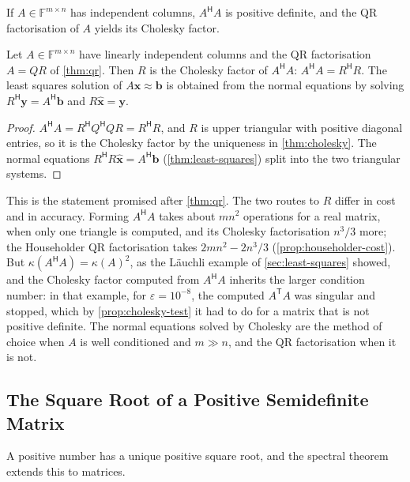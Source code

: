 If $A\in\mathbb F^{m\times n}$ has independent columns, $A^{\mathsf H}A$ is positive definite, and the QR factorisation of $A$ yields its Cholesky factor.

\begin{proposition}
\label{prop:cholesky-qr}
Let $A\in\mathbb F^{m\times n}$ have linearly independent columns and the QR factorisation $A=QR$ of \cref{thm:qr}. Then $R$ is the Cholesky factor of $A^{\mathsf H}A$: $A^{\mathsf H}A=R^{\mathsf H}R$. The least squares solution of $A\mathbf x\approx\mathbf b$ is obtained from the normal equations by solving $R^{\mathsf H}\mathbf y=A^{\mathsf H}\mathbf b$ and $R\hat{\mathbf x}=\mathbf y$.
\end{proposition}

\begin{proof}
$A^{\mathsf H}A=R^{\mathsf H}Q^{\mathsf H}QR=R^{\mathsf H}R$, and $R$ is upper triangular with positive diagonal entries, so it is the Cholesky factor by the uniqueness in \cref{thm:cholesky}. The normal equations $R^{\mathsf H}R\hat{\mathbf x}=A^{\mathsf H}\mathbf b$ (\cref{thm:least-squares}) split into the two triangular systems.
\end{proof}

This is the statement promised after \cref{thm:qr}. The two routes to $R$ differ in cost and in accuracy. Forming $A^{\mathsf H}A$ takes about $mn^2$ operations for a real matrix, when only one triangle is computed, and its Cholesky factorisation $n^3/3$ more; the Householder QR factorisation takes $2mn^2-2n^3/3$ (\cref{prop:householder-cost}). But $\kappa(A^{\mathsf H}A)=\kappa(A)^2$, as the L\"auchli example of \cref{sec:least-squares} showed, and the Cholesky factor computed from $A^{\mathsf H}A$ inherits the larger condition number: in that example, for $\varepsilon=10^{-8}$, the computed $A^{\mathsf T}A$ was singular and  stopped, which by \cref{prop:cholesky-test} it had to do for a matrix that is not positive definite. The normal equations solved by Cholesky are the method of choice when $A$ is well conditioned and $m\gg n$, and the QR factorisation when it is not.

\subsection{The Square Root of a Positive Semidefinite Matrix}

A positive number has a unique positive square root, and the spectral theorem extends this to matrices.

